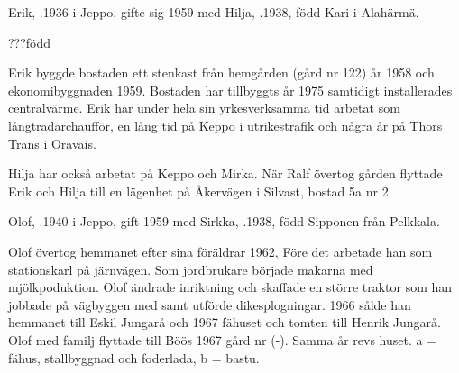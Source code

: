 Erik, .1936 i Jeppo, gifte sig 1959 med Hilja, .1938, född Kari i Alahärmä.
\begin{jhchildren}
  \item {}
  \item {} ???född
\end{jhchildren}
Erik byggde bostaden ett stenkast från hemgården (gård nr 122) år	1958 och ekonomibyggnaden 1959. Bostaden har tillbyggts år 1975 samtidigt installerades centralvärme. Erik har under hela sin yrkesverksamma tid arbetat som långtradarchaufför, en lång tid på Keppo i utrikestrafik och några år på Thors Trans i  Oravais.

Hilja har också arbetat på Keppo och Mirka. När Ralf övertog gården flyttade Erik och Hilja till en lägenhet på Åkervägen i Silvast, bostad 5a nr 2.






Olof, .1940 i Jeppo, gift 1959 med Sirkka, .1938, född Sipponen från Pelkkala.
\begin{jhchildren}
  \item {}
  \item {}
  \item {}
\end{jhchildren}

Olof övertog hemmanet efter sina föräldrar 1962, Före det arbetade han som stationskarl på järnvägen. Som jordbrukare började makarna med mjölkpoduktion. Olof ändrade inriktning och skaffade en större traktor som  han jobbade på vägbyggen med samt utförde dikesplogningar. 1966 sålde han hemmanet till Eskil Jungarå och 1967 fähuset och tomten till Henrik Jungarå. Olof med familj flyttade till Böös 1967 gård nr (-). Samma år revs huset.  a = fähus, stallbyggnad och foderlada, b = bastu.



